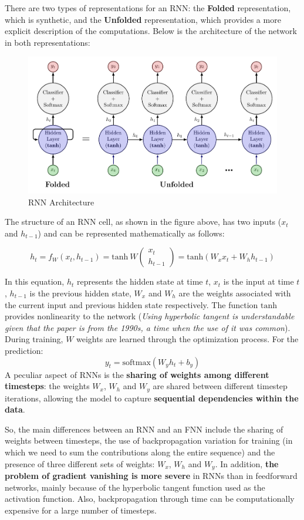 There are two types of representations for an RNN: the \textbf{Folded} representation, which is synthetic, and the \textbf{Unfolded} representation, which provides a more explicit description of the computations. Below is the architecture of the network in both representations:

\begin{figure}[!htbp]
    \centering
    \includegraphics[width = 0.9\linewidth]{tikz/chapter6 - RNN Architecture.pdf}
    \caption{RNN Architecture}
\end{figure}

The structure of an RNN cell, as shown in the figure above, has two inputs ($x_t$ and $h_{t-1}$) and can be represented mathematically as follows:

$$
h_t = f_W(x_t,h_{t-1}) = \text{tanh} \ W \begin{pmatrix}
x_t \\
h_{t-1}
\end{pmatrix} = \text{tanh}(W_xx_t + W_hh_{t-1})
$$

In this equation, $h_t$ represents the hidden state at time $t$, $x_t$ is the input at time $t$, $h_{t-1}$ is the previous hidden state, $W_x$ and $W_h$ are the weights associated with the current input and previous hidden state respectively. The function $\text{tanh}$ provides nonlinearity to the network (\textit{Using hyperbolic tangent is understandable given that the paper is from the 1990s, a time when the use of it was common}). During training, $W$ weights are learned through the optimization process. For the prediction:
$$
y_t = \text{softmax}(W_y h_t + b_y)
$$
A peculiar aspect of RNNs is the \textbf{sharing of weights among different timesteps}: the weights $W_x$, $W_h$ and $W_y$ are shared between different timestep iterations, allowing the model to capture \textbf{sequential dependencies within the data}.

So, the main differences between an RNN and an FNN include the sharing of weights between timesteps, the use of backpropagation variation for training (in which we need to sum the contributions along the entire sequence) and the presence of three different sets of weights: $W_x$, $W_h$ and $W_y$. In addition, \textbf{the problem of gradient vanishing is more severe} in RNNs than in feedforward networks, mainly because of the hyperbolic tangent function used as the activation function. Also, backpropagation through time can be computationally expensive for a large number of timesteps.


